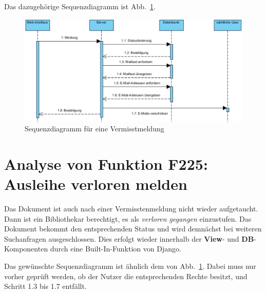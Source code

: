Das dazugehörige Sequenzdiagramm ist Abb.\ \ref{fig:224}.
\begin{figure}
\begin{center}
\includegraphics[width=0.8\linewidth]{bilder/Seq-Vermisst.pdf}
\caption{Sequenzdiagramm für eine Vermisstmeldung}
\label{fig:224}
\end{center}
\end{figure}

\section{Analyse von Funktion F225: Ausleihe verloren melden}
\label{f:225}
Das Dokument ist auch nach einer Vermisstenmeldung nicht wieder aufgetaucht. Dann ist ein Bibliothekar berechtigt, es als \emph{verloren gegangen} einzustufen. Das Dokument bekommt den entsprechenden Status und wird demnächst bei weiteren Suchanfragen ausgeschlossen. Dies erfolgt wieder innerhalb der \textbf{View}- und \textbf{DB}-Komponenten durch eine Built-In-Funktion von Django.


Das gewünschte Sequenzdiagramm ist ähnlich dem von Abb.\ \ref{fig:224}. Dabei muss nur vorher geprüft werden, ob der Nutzer die entsprechenden Rechte besitzt, und Schritt 1.3 bis 1.7 entfällt.


